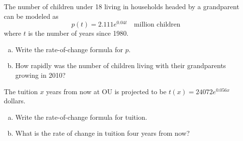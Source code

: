 \documentclass[notes]{subfiles}
\begin{document}
 		\begin{ex}
 			The number of children under 18 living in households headed by a grandparent can be modeled as
 				\[p(t) = 2.111e^{0.04t}\quad \text{million children}\]
 				where $t$ is the number of years since 1980.
 			\begin{enumerate}[(a)]
 				\item Write the rate-of-change formula for $p$.
 				\item How rapidly was the number of children living with their grandparents growing in 2010?
 			\end{enumerate}
 		\end{ex}
			\newpage
 		\begin{ex}
 			The tuition $x$ years from now at OU is projected to be $t(x) = 24072e^{0.056x}$ dollars. 
 			\begin{enumerate}[(a)]
 				\item Write the rate-of-change formula for tuition.
 					 \vs{1}
 				\item What is the rate of change in tuition four years from now?
 					 \vs{1}
 			\end{enumerate}
 		\end{ex}
 		
	\clearpage
\end{document}
